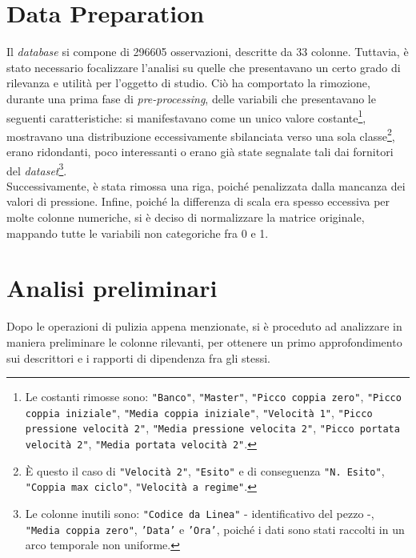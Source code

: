 \documentclass[fleqn,10pt]{SelfArx} %
\begin{document}
\section{Data Preparation}
Il \textit{database} si compone di 296605 osservazioni, descritte da 33 colonne. Tuttavia, è stato necessario focalizzare l'analisi su quelle che presentavano un certo grado di rilevanza e utilità per l'oggetto di studio. Ciò ha comportato la rimozione, durante una prima fase di \textit{pre-processing}, delle variabili che presentavano le seguenti caratteristiche: si manifestavano come un unico valore costante\footnote{Le costanti rimosse sono: \texttt{"Banco"}, \texttt{"Master"}, \texttt{"Picco coppia zero"}, \texttt{"Picco coppia iniziale"}, \texttt{"Media coppia iniziale"}, \texttt{"Velocità 1"}, \texttt{"Picco pressione velocità 2"}, \texttt{"Media pressione velocita 2"}, \texttt{"Picco portata velocità 2"}, \texttt{"Media portata velocità 2"}.}, mostravano una distribuzione eccessivamente sbilanciata verso una sola classe\footnote{È questo il caso di \texttt{"Velocità 2"}, \texttt{"Esito"} e di conseguenza \texttt{"N. Esito"}, \texttt{"Coppia max ciclo"}, \texttt{"Velocità a regime"}.}, erano ridondanti, poco interessanti o erano già state segnalate tali dai fornitori del \textit{dataset}\footnote{Le colonne inutili sono: \texttt{"Codice da Linea"} - identificativo del pezzo -, \texttt{"Media coppia zero"}, \texttt{'Data'} e \texttt{'Ora'}, poiché i dati sono stati raccolti in un arco temporale non uniforme.}.\\
Successivamente, è stata rimossa una riga, poiché penalizzata dalla mancanza dei valori di pressione. Infine, poiché la differenza di scala era spesso eccessiva per molte colonne numeriche, si è deciso di normalizzare la matrice originale, mappando tutte le variabili non categoriche fra 0 e 1. 
\section{Analisi preliminari}\label{prem}
Dopo le operazioni di pulizia appena menzionate, si è proceduto ad analizzare in maniera preliminare le colonne rilevanti, per ottenere un primo approfondimento sui descrittori e i rapporti di dipendenza fra gli stessi. 
\end{document}
